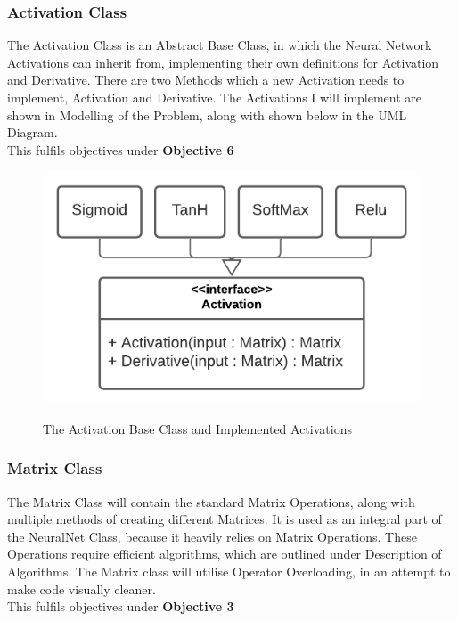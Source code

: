 \begin{flushleft}
            \subsubsection{Activation Class}
                The Activation Class is an Abstract Base Class, in which the Neural Network Activations can inherit from, implementing
                their own definitions for Activation and Derivative. There are two Methods which a new Activation needs to implement,
                Activation and Derivative. The Activations I will implement are shown in Modelling of the Problem, along with shown
                below in the UML Diagram.\\
                \vspace{0.2cm}
                This fulfils objectives under \textbf{Objective 6} \\

                \begin{figure}[H]
                    \centering
                    \includegraphics[width=.65\textwidth]{Images/Design/Classes/Activation.png} \\
                    \caption*{The Activation Base Class and Implemented Activations}
                \end{figure}
            \subsubsection{Matrix Class}
                The Matrix Class will contain the standard Matrix Operations, along with multiple methods of creating different 
                Matrices. It is used as an integral part of the NeuralNet Class, because it heavily relies on Matrix Operations.
                These Operations require efficient algorithms, which are outlined under Description of Algorithms. The Matrix
                class will utilise Operator Overloading, in an attempt to make code visually cleaner. \\
                \vspace{0.2cm}
                This fulfils objectives under \textbf{Objective 3} \\


\end{flushleft}
